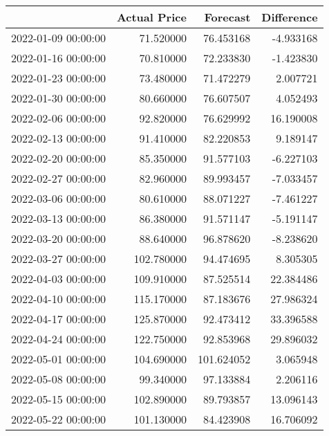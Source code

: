 \begin{tabular}{lrrr}
\toprule
 & Actual Price & Forecast & Difference \\
\midrule
2022-01-09 00:00:00 & 71.520000 & 76.453168 & -4.933168 \\
2022-01-16 00:00:00 & 70.810000 & 72.233830 & -1.423830 \\
2022-01-23 00:00:00 & 73.480000 & 71.472279 & 2.007721 \\
2022-01-30 00:00:00 & 80.660000 & 76.607507 & 4.052493 \\
2022-02-06 00:00:00 & 92.820000 & 76.629992 & 16.190008 \\
2022-02-13 00:00:00 & 91.410000 & 82.220853 & 9.189147 \\
2022-02-20 00:00:00 & 85.350000 & 91.577103 & -6.227103 \\
2022-02-27 00:00:00 & 82.960000 & 89.993457 & -7.033457 \\
2022-03-06 00:00:00 & 80.610000 & 88.071227 & -7.461227 \\
2022-03-13 00:00:00 & 86.380000 & 91.571147 & -5.191147 \\
2022-03-20 00:00:00 & 88.640000 & 96.878620 & -8.238620 \\
2022-03-27 00:00:00 & 102.780000 & 94.474695 & 8.305305 \\
2022-04-03 00:00:00 & 109.910000 & 87.525514 & 22.384486 \\
2022-04-10 00:00:00 & 115.170000 & 87.183676 & 27.986324 \\
2022-04-17 00:00:00 & 125.870000 & 92.473412 & 33.396588 \\
2022-04-24 00:00:00 & 122.750000 & 92.853968 & 29.896032 \\
2022-05-01 00:00:00 & 104.690000 & 101.624052 & 3.065948 \\
2022-05-08 00:00:00 & 99.340000 & 97.133884 & 2.206116 \\
2022-05-15 00:00:00 & 102.890000 & 89.793857 & 13.096143 \\
2022-05-22 00:00:00 & 101.130000 & 84.423908 & 16.706092 \\
\bottomrule
\end{tabular}
